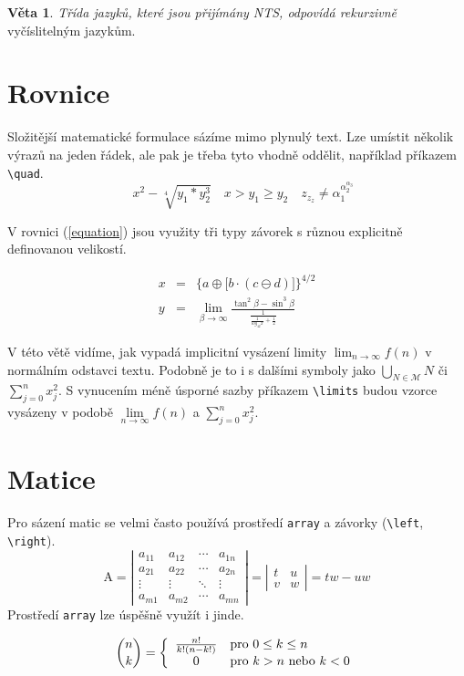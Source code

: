 \documentclass[a4paper, 11pt, twocolumn]{article}
\theoremstyle{definition}
\theoremstyle{definition}
\newtheorem{sentence}{Věta}
\begin{document}
\begin{sentence}
    \textit{Třída jazyků, které jsou přijímány NTS, odpovídá rekurzivně} vyčíslitelným jazykům.
\end{sentence}


\section{Rovnice}

Složitější matematické formulace sázíme mimo plynulý text. Lze umístit několik výrazů na jeden řádek, ale pak je třeba tyto vhodně oddělit, například příkazem \texttt{{\textbackslash quad}}.
$$\quad x^2-\sqrt[4]{y_1*y_2^3} \quad x > y_1 \geq y_2 \quad z_{z_z} \neq \alpha_1^{\alpha_2^{\alpha_3}}$$

V rovnici (\ref{equation}) jsou využity tři typy závorek s různou explicitně definovanou velikostí.

\begin{eqnarray}
\label{equation}x&=& \bigg\{a\oplus \Big[b \cdot (c\ominus d)\Big] \bigg\}^{4/2}\\
\label{Rovnice}y&=&\lim_{\beta \to \infty} \frac{\tan^2 \beta - \sin^3 \beta}{\frac{1}{\frac{1}{log_{42}x}+\frac{1}{2}}}
\end{eqnarray}
\par V této větě vidíme, jak vypadá implicitní vysázení limity $\lim_{n \to \infty} f(n)$ v normálním odstavci textu. Podobně je to i s dalšími symboly jako $\bigcup_{N\in \mathcal{M}} N$ či  $\sum_{j=0}^n x_j^2$. 
S vynucením méně úsporné sazby příkazem \texttt{{\textbackslash limits}} budou vzorce vysázeny v podobě $\lim\limits _{n \to \infty}f(n)$ a $\sum\limits _{j=0}^n x_j^2$. 


\section{Matice}

Pro sázení matic se velmi často používá prostředí \texttt{array} a závorky (\texttt{{\textbackslash left}}, \texttt{{\textbackslash right}}). 
$$ \mathrm{A} = \left|
\begin{array}{cccc}
a_{11}& a_{12}& \cdots& a_{1n}\\
a_{21}& a_{22}& \cdots& a_{2n}\\
\vdots& \vdots& \ddots& \vdots\\
a_{m1}& a_{m2}& \cdots& a_{mn}
\end{array} \right| = \left|
\begin{array}{cc}
t& u\\
v& w
\end{array}\right| =tw - uw$$
Prostředí \texttt{array} lze úspěšně využít i jinde.

$$ \binom{n}{k} = \left\{
\begin{array}{c l}
\frac{n!}{k!(n-k!)} & \text{pro 0} \leq k \leq n \\
0 & \text{pro } k > n \text{ nebo } k < 0
\end{array} \right.$$
\end{document}
